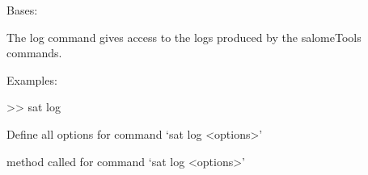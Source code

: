 \documentclass[a4paper,10pt,english]{sphinxmanual}
\begin{document}
\begin{fulllineitems}
\label{\detokenize{apidoc_commands/commands:commands.log.Command}}
Bases: 

The log command gives access to the logs produced by the salomeTools commands.

\begin{DUlineblock}{0em}
\item[] Examples:
\item[] \textgreater{}\textgreater{} sat log
\end{DUlineblock}

\begin{fulllineitems}
\label{\detokenize{apidoc_commands/commands:commands.log.Command.getParser}}
Define all options for command ‘sat log \textless{}options\textgreater{}’

\end{fulllineitems}


\begin{fulllineitems}
\label{\detokenize{apidoc_commands/commands:commands.log.Command.name}}
\end{fulllineitems}


\begin{fulllineitems}
\label{\detokenize{apidoc_commands/commands:commands.log.Command.run}}
method called for command ‘sat log \textless{}options\textgreater{}’

\end{fulllineitems}


\end{fulllineitems}

\end{document}
